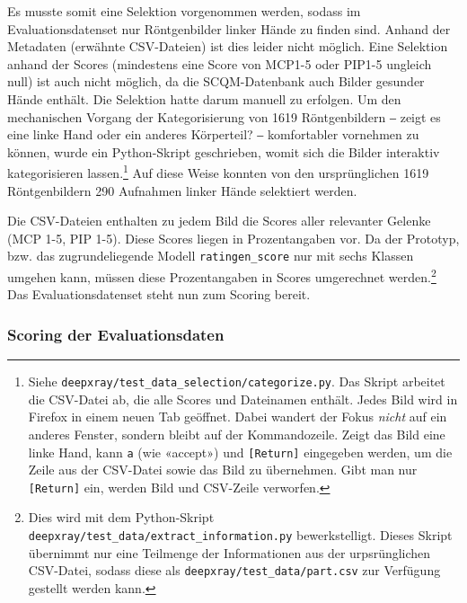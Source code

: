 Es musste somit eine Selektion vorgenommen werden, sodass im Evaluationsdatenset nur Röntgenbilder linker Hände zu finden sind. Anhand der Metadaten (erwähnte CSV-Dateien) ist dies leider nicht möglich. Eine Selektion anhand der Scores (mindestens eine Score von MCP1-5 oder PIP1-5 ungleich null) ist auch nicht möglich, da die SCQM-Datenbank auch Bilder gesunder Hände enthält. Die Selektion hatte darum manuell zu erfolgen. Um den mechanischen Vorgang der Kategorisierung von 1619 Röntgenbildern ‒ zeigt es eine linke Hand oder ein anderes Körperteil? ‒ komfortabler vornehmen zu können, wurde ein Python-Skript geschrieben, womit sich die Bilder interaktiv kategorisieren lassen.\footnote{Siehe \texttt{deepxray/test\_data\_selection/categorize.py}. Das Skript arbeitet die CSV-Datei ab, die alle Scores und Dateinamen enthält. Jedes Bild wird in Firefox in einem neuen Tab geöffnet. Dabei wandert der Fokus \textit{nicht} auf ein anderes Fenster, sondern bleibt auf der Kommandozeile. Zeigt das Bild eine linke Hand, kann \texttt{a} (wie «accept») und \texttt{[Return]} eingegeben werden, um die Zeile aus der CSV-Datei sowie das Bild zu übernehmen. Gibt man nur \texttt{[Return]} ein, werden Bild und CSV-Zeile verworfen.} Auf diese Weise konnten von den ursprünglichen 1619 Röntgenbildern 290 Aufnahmen linker Hände selektiert werden.

Die CSV-Dateien enthalten zu jedem Bild die Scores aller relevanter Gelenke (MCP 1-5, PIP 1-5). Diese Scores liegen in Prozentangaben vor. Da der Prototyp, bzw. das zugrundeliegende Modell \texttt{ratingen\_score} nur mit sechs Klassen umgehen kann, müssen diese Prozentangaben in Scores umgerechnet werden.\footnote{Dies wird mit dem Python-Skript \texttt{deepxray/test\_data/extract\_information.py} bewerkstelligt. Dieses Skript übernimmt nur eine Teilmenge der Informationen aus der urpsrünglichen CSV-Datei, sodass diese als \texttt{deepxray/test\_data/part.csv} zur Verfügung gestellt werden kann.} Das Evaluationsdatenset steht nun zum Scoring bereit.

\subsubsection{Scoring der Evaluationsdaten}


